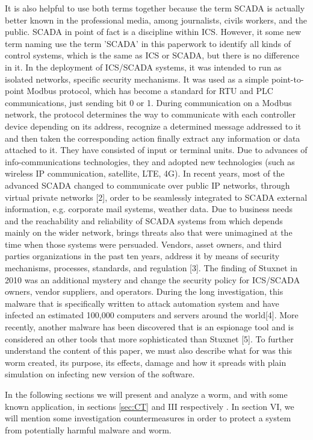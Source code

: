 \documentclass[conference]{IEEEtran}
\begin{document}
It is also helpful to use both terms together because the term SCADA is actually better known in the professional media, among journalists, civils workers, and the public. SCADA in point of fact is a discipline within ICS. However,  it some new term naming use the term  'SCADA' in this paperwork to identify all kinds of control  systems, which is the same as ICS or SCADA, but there is no difference in it.  
In the deployment of ICS/SCADA  systems, it was intended to run as isolated networks, specific security mechanisms. It was used as a simple point-to-point Modbus protocol, which has become a standard for RTU and
PLC communications, just sending bit 0 or 1. During communication on a Modbus network, the protocol determines the way to communicate with each controller device depending on its address, recognize a determined message addressed to it and then taken the corresponding action finally extract any information or data attached to it.  They have consisted of  
input or terminal units.  Due to advances of info-communications technologies,  they and adopted
new technologies  (such as wireless  IP communication, satellite, LTE, 4G).  In recent years, most of the advanced SCADA changed to communicate over public  IP  networks, through virtual private networks [2], order to be seamlessly integrated to  SCADA external information, e.g. corporate mail  systems, weather data. Due to business needs and the reachability and reliability of SCADA  systems from which depends mainly on the wider  network, brings threats also that were unimagined at the time when those systems were persuaded. Vendors, asset owners, and third parties organizations in the past ten years, address it by means of
security mechanisms, processes, standards, and regulation [3].   
The finding of Stuxnet in 2010 was an additional mystery and change the security policy for ICS/SCADA owners, vendor suppliers, and operators.  During the long investigation, this malware that is specifically written to attack automation system and have infected an estimated 100,000 computers and servers around the world[4]. 
More recently, another malware 
has  been  discovered  that  is  an espionage  tool  and is considered    an
other tools that more sophisticated than Stuxnet [5].
To further understand the content of this paper, we must also describe what for was this worm created, its purpose, its effects, damage and how it spreads with plain simulation on infecting new version of the software.

	In the following sections we will present and analyze a worm, and with some known application, in sections  \ref{sec:CT} and III respectively . In section VI, we will mention some investigation countermeasures in order to protect a system from potentially harmful malware and worm.
\end{document}
